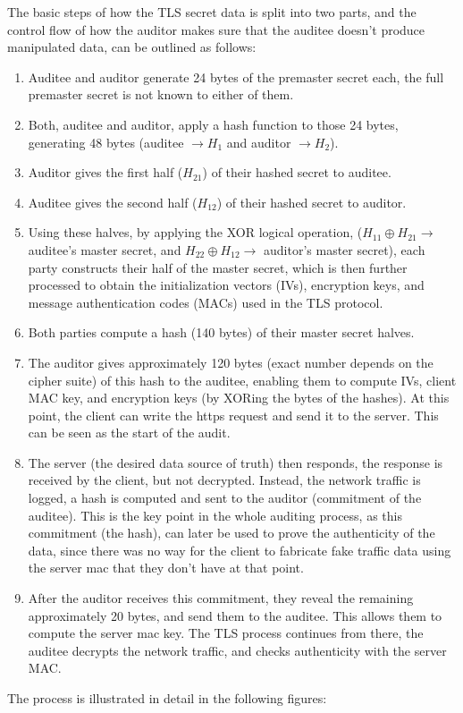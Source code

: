 The basic steps of how the TLS secret data is split into two parts, and the control flow of how the auditor makes sure that the auditee doesn't produce manipulated data, can be outlined as follows:

\begin{enumerate}
\item Auditee and auditor generate 24 bytes of the premaster secret each, the full premaster secret is not known to either of them.
\item Both, auditee and auditor, apply a hash function to those 24 bytes, generating 48 bytes (auditee $\rightarrow H_1$ and auditor $\rightarrow H_2$).
\item Auditor gives the first half ($H_{21}$) of their hashed secret to auditee.
\item Auditee gives the second half ($H_{12}$) of their hashed secret to auditor.
\item Using these halves, by applying the XOR logical operation, ($H_{11} \oplus H_{21} \rightarrow$ auditee's master secret, and $H_{22} \oplus H_{12} \rightarrow$ auditor's master secret), each party constructs their half of the master secret, which is then further processed to obtain the initialization vectors (IVs), encryption keys, and message authentication codes (MACs) used in the TLS protocol.
\item Both parties compute a hash (140 bytes) of their master secret halves.
\item The auditor gives approximately 120 bytes (exact number depends on the cipher suite) of this hash to the auditee, enabling them to compute IVs, client MAC key, and encryption keys (by XORing the bytes of the hashes). At this point, the client can write the https request and send it to the server. This can be seen as the start of the audit.
\item The server (the desired data source of truth) then responds, the response is received by the client, but not decrypted. Instead, the network traffic is logged, a hash is computed and sent to the auditor (commitment of the auditee). This is the key point in the whole auditing process, as this commitment (the hash), can later be used to prove the authenticity of the data, since there was no way for the client to fabricate fake traffic data using the server mac that they don't have at that point.
\item After the auditor receives this commitment, they reveal the remaining approximately 20 bytes, and send them to the auditee. This allows them to compute the server mac key. The TLS process continues from there, the auditee decrypts the network traffic, and checks authenticity with the server MAC.
\end{enumerate}
The process is illustrated in detail in the following figures:

